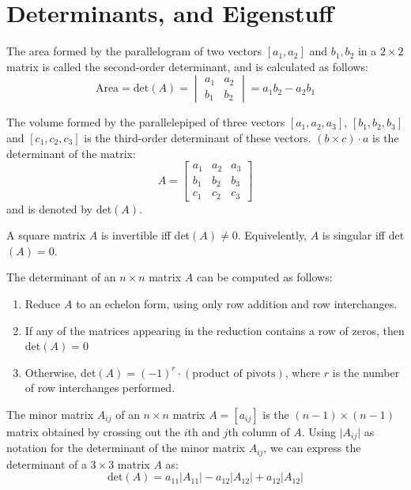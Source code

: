 \documentclass[nobib,notoc]{tufte-handout}
\begin{document}
\section{Determinants, and Eigenstuff}
\begin{defi}
	The area formed by the parallelogram of two vectors \([a_1, a_2]\) and \(b_1, b_2\) in a \(2\times 2\) matrix is called the second-order determinant, and is calculated as follows:
	\begin{equation*}
		\text{Area}=\text{det}(A)=\begin{vmatrix}a_1&a_2\\b_1&b_2\end{vmatrix}=a_1b_2-a_2b_1
	\end{equation*}
\end{defi}
\begin{defi}
	The volume formed by the parallelepiped of three vectors \([a_1,a_2,a_3]\), \([b_1,b_2,b_3]\) and \([c_1,c_2,c_3]\) is the third-order determinant of these vectors. \((b\times c)\cdot a\) is the determinant of the matrix:
	\begin{equation*}
		A=\begin{bmatrix}a_1&a_2&a_3\\b_1&b_2&b_3\\c_1&c_2&c_3\end{bmatrix}
	\end{equation*}
	and is denoted by det\((A)\).
\end{defi}
\begin{thm}
	A square matrix \(A\) is invertible iff det\((A)\neq 0\). Equivelently, \(A\) is singular iff det\((A)=0\).
\end{thm}
\begin{cor}
	The determinant of an \(n\times n\) matrix \(A\) can be computed as follows:
	\begin{enumerate}
		\item Reduce \(A\) to an echelon form, using only row addition and row interchanges.
		\item If any of the matrices appearing in the reduction contains a row of zeros, then det\((A)=0\)
		\item Otherwise, det\((A)=(-1)^{r}\cdot(\text{product of pivots})\), where \(r\) is the number of row interchanges performed.
	\end{enumerate}
\end{cor}
\begin{defi}
	The minor matrix \(A_{ij}\) of an \(n\times n\) matrix \(A=[a_{ij}]\) is the \((n-1)\times(n-1)\) matrix obtained by crossing out the \(i\)th and \(j\)th column of \(A\). Using \(\lvert A_{ij}\rvert\) as notation for the determinant of the minor matrix \(A_{ij}\), we can express the determinant of a \(3\times 3\) matrix \(A\) as:
	\begin{equation*}
		\text{det}(A)=a_{11}\lvert A_{11}\rvert-a_{12}\lvert A_{12}\rvert+a_{12}\lvert A_{12}\rvert
	\end{equation*}
\end{defi}
\end{document}
